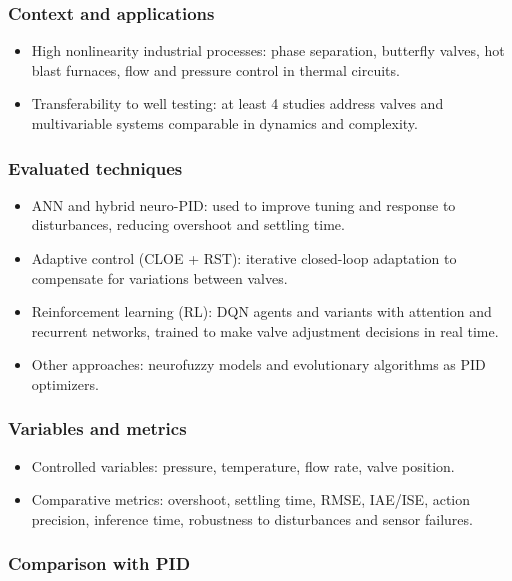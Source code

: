 \documentclass{article}
\begin{document}
\subsubsection{Context and applications}

\begin{itemize}
  \item High nonlinearity industrial processes: phase separation, butterfly valves, hot blast furnaces, flow and pressure control in thermal circuits.
  \item Transferability to well testing: at least 4 studies address valves and multivariable systems comparable in dynamics and complexity.
\end{itemize}

\subsubsection{Evaluated techniques}
\begin{itemize}
  \item ANN and hybrid neuro-PID: used to improve tuning and response to disturbances, reducing overshoot and settling time.
  \item Adaptive control (CLOE + RST): iterative closed-loop adaptation to compensate for variations between valves.
  \item Reinforcement learning (RL): DQN agents and variants with attention and recurrent networks, trained to make valve adjustment decisions in real time.
  \item Other approaches: neurofuzzy models and evolutionary algorithms as PID optimizers.
\end{itemize}

\subsubsection{Variables and metrics}

\begin{itemize}
  \item Controlled variables: pressure, temperature, flow rate, valve position.
  \item Comparative metrics: overshoot, settling time, RMSE, IAE/ISE, action precision, inference time, robustness to disturbances and sensor failures.
\end{itemize}

\subsubsection{Comparison with PID}
\end{document}
